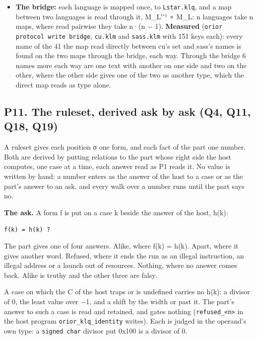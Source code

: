 \begin{itemize}
\item \textbf{The bridge:} each language is mapped once, to \texttt{Lstar.\allowbreak{}klq}, and a map between two languages is read through it, M\_\allowbreak{}L′⁻¹ ∘ M\_\allowbreak{}L: n languages take n maps, where read pairwise they take n·(n − 1). \textbf{Measured} (\texttt{orior protocol write bridge}, \texttt{cu.\allowbreak{}klm} and \texttt{sass.\allowbreak{}klm} with 151 keys each): every name of the 41 the map read directly between cu's set and sass's names is found on the two maps through the bridge, each way. Through the bridge 6 names more each way are one text with another on one side and two on the other, where the other side gives one of the two as another type, which the direct map reads as type alone.
\end{itemize}

\subsection{\texorpdfstring{P11. The ruleset, derived ask by ask (Q4, Q11, Q18, Q19)}{P11. The ruleset, derived ask by ask (Q4, Q11, Q18, Q19)}}

A ruleset gives each position σ one form, and each fact of the part one number. Both are derived by putting relations to the part whose right side the host computes, one case at a time, each answer read as P1 reads it. No value is written by hand: a number enters as the answer of the host to a case or as the part's answer to an ask, and every walk over a number runs until the part says no.

\textbf{The ask.} A form f is put on a case k beside the answer of the host, h(k):

\texttt{f(k) = h(k) ?}

The part gives one of four answers. Alike, where f(k) = h(k). Apart, where it gives another word. Refused, where it ends the run as an illegal instruction, an illegal address or a launch out of resources. Nothing, where no answer comes back. Alike is truthy and the other three are falsy.

A case on which the C of the host traps or is undefined carries no h(k): a divisor of 0, the least value over −1, and a shift by the width or past it. The part's answer to such a case is read and retained, and gates nothing (\texttt{refused\_\allowbreak{}<n>} in the host program \texttt{orior\_\allowbreak{}klq\_\allowbreak{}identity} writes). Each is judged in the operand's own type: a \texttt{signed char} divisor put 0x100 is a divisor of 0.

